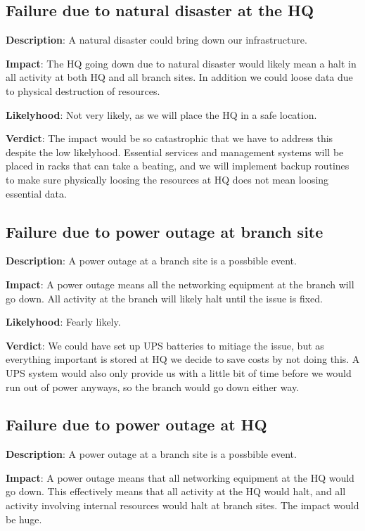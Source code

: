 \subsection{Failure due to natural disaster at the HQ}

\textbf{Description}: A natural disaster could bring down our infrastructure.

\textbf{Impact}: The HQ going down due to natural disaster would likely mean a halt in all activity at both HQ and all branch sites. In addition we could loose data due to physical destruction of resources.

\textbf{Likelyhood}: Not very likely, as we will place the HQ in a safe location.

\textbf{Verdict}: The impact would be so catastrophic that we have to address this despite the low likelyhood. Essential services and management systems will be placed in racks that can take a beating\cite{todo}, and we will implement backup routines to make sure physically loosing the resources at HQ does not mean loosing essential data.

\subsection{Failure due to power outage at branch site}

\textbf{Description}: A power outage at a branch site is a possbible event.

\textbf{Impact}: A power outage means all the networking equipment at the branch will go down. All activity at the branch will likely halt until the issue is fixed.

\textbf{Likelyhood}: Fearly likely.

\textbf{Verdict}: We could have set up UPS batteries to mitiage the issue, but as everything important is stored at HQ we decide to save costs by not doing this. A UPS system would also only provide us with a little bit of time before we would run out of power anyways, so the branch would go down either way.

\subsection{Failure due to power outage at HQ}

\textbf{Description}: A power outage at a branch site is a possbible event.

\textbf{Impact}: A power outage means that all networking equipment at the HQ would go down. This effectively means that all activity at the HQ would halt, and all activity involving internal resources would halt at branch sites. The impact would be huge.

